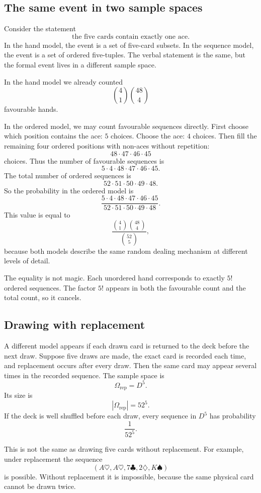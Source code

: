\subsection*{The same event in two sample spaces}

Consider the statement
\[
\text{the five cards contain exactly one ace.}
\]
In the hand model, the event is a set of five-card subsets. In the sequence
model, the event is a set of ordered five-tuples. The verbal statement is the
same, but the formal event lives in a different sample space.

In the hand model we already counted
\[
\binom41\binom{48}{4}
\]
favourable hands.

In the ordered model, we may count favourable sequences directly. First choose
which position contains the ace: \(5\) choices. Choose the ace: \(4\) choices.
Then fill the remaining four ordered positions with non-aces without repetition:
\[
48\cdot47\cdot46\cdot45
\]
choices. Thus the number of favourable sequences is
\[
5\cdot4\cdot48\cdot47\cdot46\cdot45.
\]
The total number of ordered sequences is
\[
52\cdot51\cdot50\cdot49\cdot48.
\]
So the probability in the ordered model is
\[
\frac{5\cdot4\cdot48\cdot47\cdot46\cdot45}
{52\cdot51\cdot50\cdot49\cdot48}.
\]
This value is equal to
\[
\frac{\binom41\binom{48}{4}}{\binom{52}{5}},
\]
because both models describe the same random dealing mechanism at different
levels of detail.

The equality is not magic. Each unordered hand corresponds to exactly \(5!\)
ordered sequences. The factor \(5!\) appears in both the favourable count and
the total count, so it cancels.

\subsection*{Drawing with replacement}

A different model appears if each drawn card is returned to the deck before the
next draw. Suppose five draws are made, the exact card is recorded each time,
and replacement occurs after every draw. Then the same card may appear several
times in the recorded sequence. The sample space is
\[
\Omega_{\mathrm{rep}}=D^5.
\]
Its size is
\[
|\Omega_{\mathrm{rep}}|=52^5.
\]
If the deck is well shuffled before each draw, every sequence in \(D^5\) has
probability
\[
\frac1{52^5}.
\]

This is not the same as drawing five cards without replacement. For example,
under replacement the sequence
\[
(A\heartsuit,A\heartsuit,7\clubsuit,2\diamondsuit,K\spadesuit)
\]
is possible. Without replacement it is impossible, because the same physical
card cannot be drawn twice.

